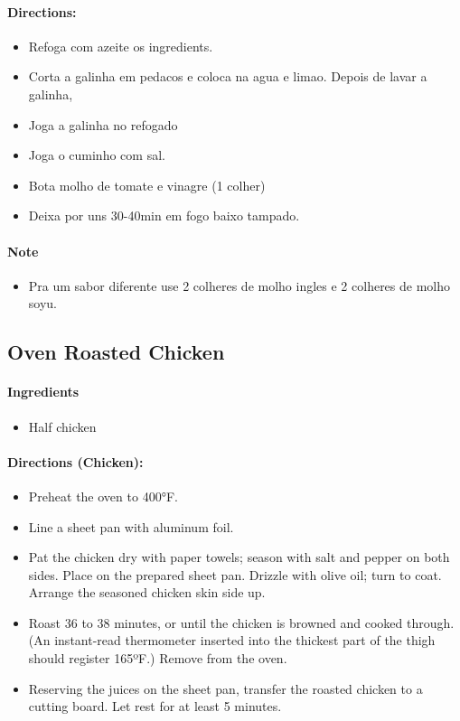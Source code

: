 \documentclass{article}
\begin{document}
\paragraph{Directions:}
\begin{itemize}
	\item Refoga com azeite os ingredients.
	\item Corta a galinha em pedacos e coloca na agua e limao. Depois de lavar a galinha,
	\item Joga a galinha no refogado
	\item Joga o cuminho com sal.
	\item Bota molho de tomate e vinagre (1 colher)
	\item Deixa por uns 30-40min em fogo baixo tampado.
\end{itemize}

\paragraph{Note}
\begin{itemize}
	\item Pra um sabor diferente use 2 colheres de molho ingles e 2 colheres de molho soyu.
\end{itemize}

\subsection{Oven Roasted Chicken}

\paragraph{Ingredients}
\begin{itemize}
	\item Half chicken
\end{itemize}

\paragraph{Directions (Chicken):}
\begin{itemize}
	\item Preheat the oven to 400°F. 
	\item Line a sheet pan with aluminum foil. 
	\item Pat the chicken dry with paper towels; season with salt and pepper on
	both sides. Place on the prepared sheet pan. Drizzle with olive oil; turn
	to coat. Arrange the seasoned chicken skin side up. 
	\item Roast 36 to 38 minutes, or until the chicken is browned and cooked
	through. (An instant-read thermometer inserted into the thickest part
	of the thigh should register 165ºF.) Remove from the oven. 
	\item Reserving the juices on the sheet pan, transfer the roasted chicken to a
	cutting board. Let rest for at least 5 minutes.
\end{itemize}
\end{document}
